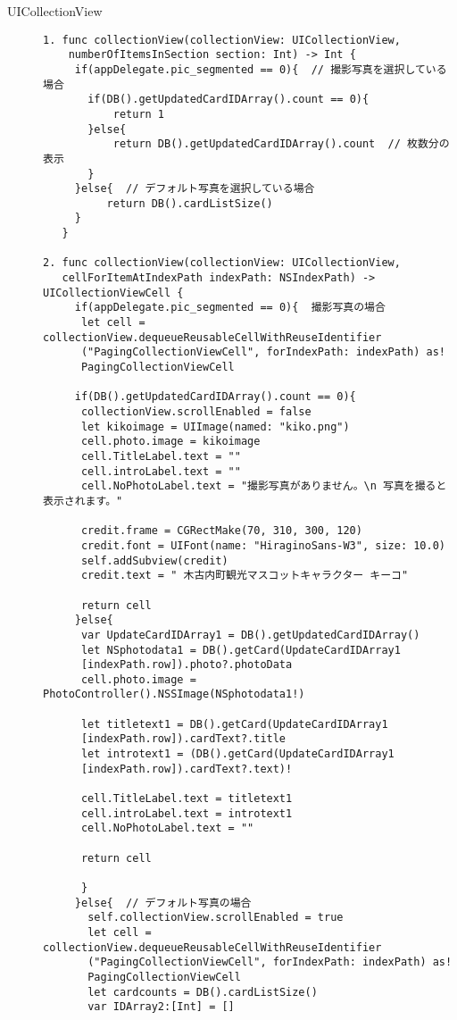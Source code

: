 \begin{description}
\item[UICollectionView]\mbox{} 
\begin{lstlisting}[basicstyle=\ttfamily\footnotesize, frame=single]
1. func collectionView(collectionView: UICollectionView, 
    numberOfItemsInSection section: Int) -> Int {
     if(appDelegate.pic_segmented == 0){  // 撮影写真を選択している場合
       if(DB().getUpdatedCardIDArray().count == 0){
           return 1
       }else{
           return DB().getUpdatedCardIDArray().count  // 枚数分の表示
       }
     }else{  // デフォルト写真を選択している場合
          return DB().cardListSize()
     }
   }
    
2. func collectionView(collectionView: UICollectionView, 
   cellForItemAtIndexPath indexPath: NSIndexPath) -> UICollectionViewCell {
     if(appDelegate.pic_segmented == 0){  撮影写真の場合
      let cell = collectionView.dequeueReusableCellWithReuseIdentifier
      ("PagingCollectionViewCell", forIndexPath: indexPath) as!
      PagingCollectionViewCell
            
     if(DB().getUpdatedCardIDArray().count == 0){
      collectionView.scrollEnabled = false
      let kikoimage = UIImage(named: "kiko.png")
      cell.photo.image = kikoimage
      cell.TitleLabel.text = ""
      cell.introLabel.text = ""
      cell.NoPhotoLabel.text = "撮影写真がありません。\n 写真を撮ると表示されます。"
                
      credit.frame = CGRectMake(70, 310, 300, 120)
      credit.font = UIFont(name: "HiraginoSans-W3", size: 10.0)
      self.addSubview(credit)
      credit.text = " 木古内町観光マスコットキャラクター キーコ"
                
      return cell
     }else{
      var UpdateCardIDArray1 = DB().getUpdatedCardIDArray()
      let NSphotodata1 = DB().getCard(UpdateCardIDArray1
      [indexPath.row]).photo?.photoData
      cell.photo.image = PhotoController().NSSImage(NSphotodata1!)
                
      let titletext1 = DB().getCard(UpdateCardIDArray1
      [indexPath.row]).cardText?.title
      let introtext1 = (DB().getCard(UpdateCardIDArray1
      [indexPath.row]).cardText?.text)!
                
      cell.TitleLabel.text = titletext1
      cell.introLabel.text = introtext1
      cell.NoPhotoLabel.text = ""
                
      return cell
                
      }
     }else{  // デフォルト写真の場合
       self.collectionView.scrollEnabled = true
       let cell = collectionView.dequeueReusableCellWithReuseIdentifier
       ("PagingCollectionViewCell", forIndexPath: indexPath) as! 
       PagingCollectionViewCell
       let cardcounts = DB().cardListSize()
       var IDArray2:[Int] = []
            

\end{lstlisting}
\end{description}
